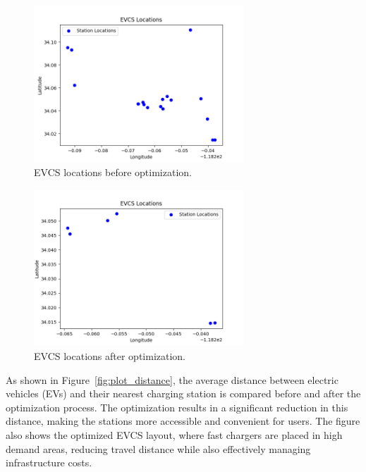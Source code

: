 \begin{figure}[h!]
\centering
\includegraphics[width=0.7\textwidth]{../Figures/original_map.png}
\caption{EVCS locations before optimization.}
\label{fig:location_before}
\end{figure}

\begin{figure}[h!]
\centering
\includegraphics[width=0.7\textwidth]{../Figures/optimized_map.png}
\caption{EVCS locations after optimization.}
\label{fig:location_after}
\end{figure}

\newpage

As shown in Figure~\ref{fig:plot_distance}, the average distance between electric vehicles (EVs) and their nearest charging station is compared before and after the optimization process. The optimization results in a significant reduction in this distance, making the stations more accessible and convenient for users. The figure also shows the optimized EVCS layout, where fast chargers are placed in high demand areas, reducing travel distance while also effectively managing infrastructure costs.

\newpage

